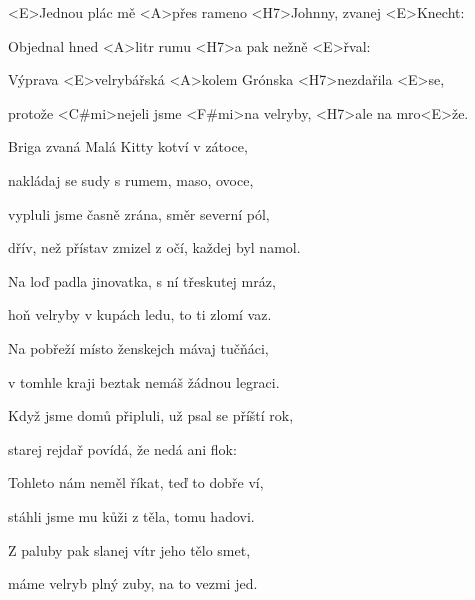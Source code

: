

\zs
<E>Jednou plác mě <A>přes rameno <H7>Johnny, zvanej <E>Knecht:


Objednal hned <A>litr rumu <H7>a pak nežně <E>řval:

\ks

\zr
Výprava <E>velrybářská <A>kolem Grónska <H7>nezdařila <E>se,

protože <C#mi>nejeli jsme <F#mi>na velryby, <H7>ale na mro<E>že.
\kr

\zs
Briga zvaná Malá Kitty kotví v zátoce,

nakládaj se sudy s rumem, maso, ovoce,

vypluli jsme časně zrána, směr severní pól,

dřív, než přístav zmizel z očí, každej byl namol.
\ks

\zr \kr

\zs
Na loď padla jinovatka, s ní třeskutej mráz,

hoň velryby v kupách ledu, to ti zlomí vaz.

Na pobřeží místo ženskejch mávaj tučňáci,

v tomhle kraji beztak nemáš žádnou legraci.
\ks

\zr \kr

\zs
Když jsme domů připluli, už psal se příští rok,

starej rejdař povídá, že nedá ani flok:

\ks

\zr \kr

\zs
Tohleto nám neměl říkat, teď to dobře ví,

stáhli jsme mu kůži z těla, tomu hadovi.

Z paluby pak slanej vítr jeho tělo smet,

máme velryb plný zuby, na to vezmi jed.
\ks

\zr \kr

\kp
